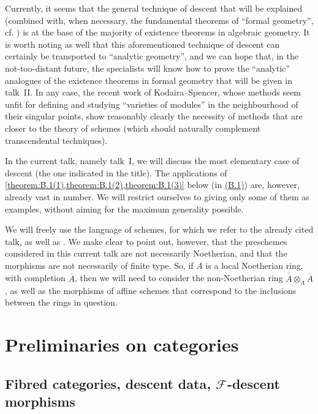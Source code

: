 \documentclass{article}
\theoremstyle{plain}
\theoremstyle{definition}
\newcommand{\sh}[1]{{\mathscr{#1}}}
\newcommand{\oldpage}[1]{\marginpar{\footnotesize$\Big\vert$ \textit{p.~#1}}}
\begin{document}
Currently, it seems that the general technique of descent that will be explained (combined with, when necessary, the fundamental theorems of ``formal geometry'', cf. \cite{3}) is at the base of the majority of existence theorems in algebraic geometry.
It is worth noting as well that this aforementioned technique of descent can certainly be transported to ``analytic geometry'', and we can hope that, in the not-too-distant future, the specialists will know how to prove the ``analytic'' analogues of the existence theorems in formal geometry that will be given in talk~II.
In any case, the recent work of Kodaira--Spencer, whose methods seem unfit for defining and studying ``varieties of modules'' in the neighbourhood of their singular points, show reasonably clearly the necessity of methods that are closer to the theory of schemes (which should naturally complement transcendental techniques).

In the current talk, namely talk~I, we will discuss the most elementary case of descent (the one indicated in the title).
The applications of \cref{theorem:B.1(1),theorem:B.1(2),theorem:B.1(3)} below (in \hyperref[B.1]{(B.1)}) are, however, already vast in number.
We will restrict ourselves to giving only some of them as examples, without aiming for the maximum generality possible.

We will freely use the language of schemes, for which we refer to the already cited talk, as well as \cite{2}.
We make clear to point out, however, that the preschemes considered in this current talk are not necessarily Noetherian, and that the
\oldpage{190-02}
morphisms are not necessarily of finite type.
So, if $A$ is a local Noetherian ring, with completion $\overline{A}$, then we will need to consider the non-Noetherian ring $\overline{\overline{A}}\otimes_A\overline{A}$, as well as the morphisms of affine schemes that correspond to the inclusions between the rings in question.


\section{Preliminaries on categories}
\label{A}


\subsection{Fibred categories, descent data, \texorpdfstring{$\sh{F}$}{F}-descent morphisms}
\label{A.1}

\subsubsection{}
\label{A.1.a}
\end{document}
